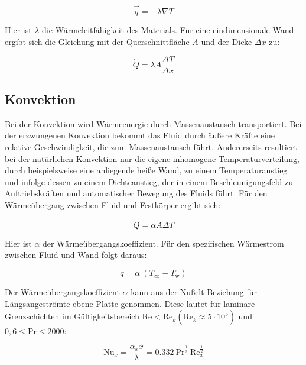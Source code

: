 \begin{equation}
  \label{eq:fourier}
  \vec{\dot{q}} = -\lambda \nabla T
\end{equation}

Hier ist $\lambda$ die Wärmeleitfähigkeit des Materials.
Für eine eindimensionale Wand ergibt sich die Gleichung mit der Querschnittfläche $A$ und der Dicke $\Delta x$ zu:

\begin{equation}
  \label{eq:fourier_1d}
  \dot{Q} = \lambda A \frac{\Delta T}{\Delta x}
\end{equation}

\subsection{Konvektion}\label{sec:konvektion}

Bei der Konvektion wird Wärmeenergie durch Massenaustausch transportiert. Bei der erzwungenen Konvektion bekommt das Fluid durch äußere Kräfte
eine relative Geschwindigkeit, die zum Massenaustausch führt. Andererseits resultiert bei der natürlichen Konvektion nur die eigene
inhomogene Temperaturverteilung, durch beispielsweise eine anliegende heiße Wand, zu einem Temperaturanstieg und infolge dessen zu einem
Dichteanstieg, der in einem Beschleunigungsfeld zu Auftriebskräften und automatischer Bewegung des Fluids führt.
Für den Wärmeübergang zwischen Fluid und Festkörper ergibt sich:

\begin{equation}
    \dot{Q}=\alpha A \Delta T 
\end{equation}

Hier ist $\alpha$ der Wärmeübergangskoeffizient.
Für den spezifischen Wärmestrom zwischen Fluid und Wand folgt daraus:

\begin{equation}
  \label{eq:qdot_freestream}
  \dot{q} = \alpha \ (T_{\infty} - T_\text{w})
\end{equation}

Der Wärmeübergangskoeffizient $\alpha$ kann aus der Nußelt-Beziehung für Längsangeströmte ebene Platte genommen. Diese lautet
für laminare Grenzschichten im Gültigkeitsbereich $\text{Re} < \text{Re}_k \left(\text{Re}_k \approx 5 \cdot 10^5\right)$ und $0,6 \leq \text{Pr} \leq 2000$:

\begin{equation}
  \label{eq:nusselt_laminar}
  \text{Nu}_x = \frac{\alpha_x x}{\lambda} = \num{0,332} \ \text{Pr}^{\frac{1}{3}} \ \text{Re}_x^{\frac{1}{2}}
\end{equation}

